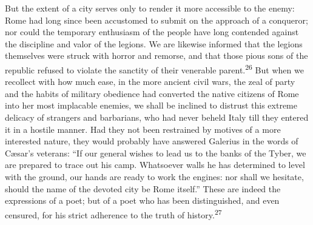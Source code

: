 But the extent of a city serves only to render it more accessible
to the enemy: Rome had long since been accustomed to submit on
the approach of a conqueror; nor could the temporary enthusiasm
of the people have long contended against the discipline and
valor of the legions. We are likewise informed that the legions
themselves were struck with horror and remorse, and that those
pious sons of the republic refused to violate the sanctity of
their venerable parent.\textsuperscript{26} But when we recollect with how much
ease, in the more ancient civil wars, the zeal of party and the
habits of military obedience had converted the native citizens of
Rome into her most implacable enemies, we shall be inclined to
distrust this extreme delicacy of strangers and barbarians, who
had never beheld Italy till they entered it in a hostile manner.
Had they not been restrained by motives of a more interested
nature, they would probably have answered Galerius in the words
of Cæsar’s veterans: “If our general wishes to lead us to the
banks of the Tyber, we are prepared to trace out his camp.
Whatsoever walls he has determined to level with the ground, our
hands are ready to work the engines: nor shall we hesitate,
should the name of the devoted city be Rome itself.” These are
indeed the expressions of a poet; but of a poet who has been
distinguished, and even censured, for his strict adherence to the
truth of history.\textsuperscript{27}




